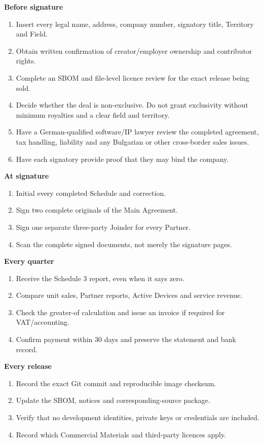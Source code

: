 \documentclass[11pt,a4paper]{article}
\begin{document}
\textbf{Before signature}
\begin{enumerate}
  \item Insert every legal name, address, company number, signatory title, Territory and Field.
  \item Obtain written confirmation of creator/employer ownership and contributor rights.
  \item Complete an SBOM and file-level licence review for the exact release being sold.
  \item Decide whether the deal is non-exclusive. Do not grant exclusivity without minimum royalties and a clear field and territory.
  \item Have a German-qualified software/IP lawyer review the completed agreement, tax handling, liability and any Bulgarian or other cross-border sales issues.
  \item Have each signatory provide proof that they may bind the company.
\end{enumerate}

\textbf{At signature}
\begin{enumerate}
  \item Initial every completed Schedule and correction.
  \item Sign two complete originals of the Main Agreement.
  \item Sign one separate three-party Joinder for every Partner.
  \item Scan the complete signed documents, not merely the signature pages.
\end{enumerate}

\textbf{Every quarter}
\begin{enumerate}
  \item Receive the Schedule 3 report, even when it says zero.
  \item Compare unit sales, Partner reports, Active Devices and service revenue.
  \item Check the greater-of calculation and issue an invoice if required for VAT/accounting.
  \item Confirm payment within 30 days and preserve the statement and bank record.
\end{enumerate}

\textbf{Every release}
\begin{enumerate}
  \item Record the exact Git commit and reproducible image checksum.
  \item Update the SBOM, notices and corresponding-source package.
  \item Verify that no development identities, private keys or credentials are included.
  \item Record which Commercial Materials and third-party licences apply.
\end{enumerate}
\end{document}
